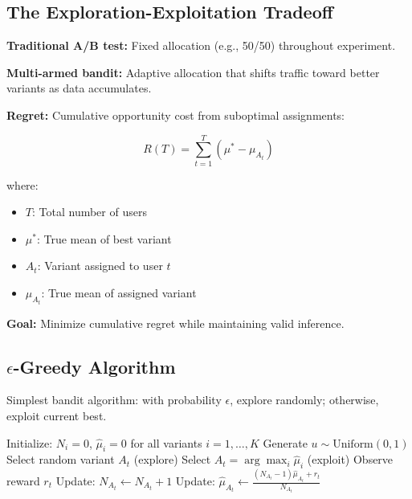 \subsection{The Exploration-Exploitation Tradeoff}

\textbf{Traditional A/B test:} Fixed allocation (e.g., 50/50) throughout experiment.

\textbf{Multi-armed bandit:} Adaptive allocation that shifts traffic toward better variants as data accumulates.

\textbf{Regret:} Cumulative opportunity cost from suboptimal assignments:

\begin{equation}
R(T) = \sum_{t=1}^T (\mu^* - \mu_{A_t})
\end{equation}

where:
\begin{itemize}
    \item $T$: Total number of users
    \item $\mu^*$: True mean of best variant
    \item $A_t$: Variant assigned to user $t$
    \item $\mu_{A_t}$: True mean of assigned variant
\end{itemize}

\textbf{Goal:} Minimize cumulative regret while maintaining valid inference.

\subsection{$\epsilon$-Greedy Algorithm}

Simplest bandit algorithm: with probability $\epsilon$, explore randomly; otherwise, exploit current best.

\begin{algorithm}[H]
\caption{$\epsilon$-Greedy Bandit}
\begin{algorithmic}
\STATE Initialize: $N_i = 0$, $\hat{\mu}_i = 0$ for all variants $i = 1, \ldots, K$
    \STATE Generate $u \sim \text{Uniform}(0, 1)$
        \STATE Select random variant $A_t$ (explore)
    \ELSE
        \STATE Select $A_t = \arg\max_i \hat{\mu}_i$ (exploit)
    \ENDIF
    \STATE Observe reward $r_t$
    \STATE Update: $N_{A_t} \leftarrow N_{A_t} + 1$
    \STATE Update: $\hat{\mu}_{A_t} \leftarrow \frac{(N_{A_t}-1)\hat{\mu}_{A_t} + r_t}{N_{A_t}}$
\ENDFOR
\end{algorithmic}
\end{algorithm}

